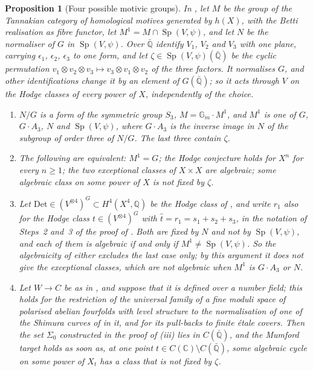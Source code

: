 \documentclass[11pt,reqno]{amsart}
\theoremstyle{plain}
\newtheorem{proposition}[theorem]{Proposition}
\theoremstyle{definition}
\theoremstyle{remark}
\newcommand{\QQ}{\mathbb{Q}}
\newcommand{\CC}{\mathbb{C}}
\DeclareMathOperator{\Sp}{Sp}
\begin{document}
\begin{proposition}[Four possible motivic groups]\label{prop:mumfordmotivic}
In , let $M$ be the group of the Tannakian category of
homological motives generated by $h(X)$, with the Betti realisation as fibre
functor, let $M^{1}=M\cap\Sp(V,\psi)$, and let $N$ be the normaliser of $G$ in
$\Sp(V,\psi)$. Over $\bar{\QQ}$ identify $V_{1}$, $V_{2}$ and $V_{3}$ with one
plane, carrying $\epsilon_{1}$, $\epsilon_{2}$, $\epsilon_{3}$ to one form, and
let $\zeta\in\Sp(V,\psi)(\bar{\QQ})$ be the cyclic permutation
$v_{1}\otimes v_{2}\otimes v_{3}\mapsto v_{3}\otimes v_{1}\otimes v_{2}$ of
the three factors. It normalises $G$, and other identifications change it by
an element of $G(\bar{\QQ})$; so it acts through $V$ on the Hodge classes of
every power of $X$, independently of the choice.
\begin{enumerate}[label=\textup{(\roman*)},leftmargin=2.6em,itemsep=2pt]
\item $N/G$ is a form of the symmetric group $S_{3}$,
  $M=\mathbb{G}_{m}\cdot M^{1}$, and $M^{1}$ is one of $G$, $G\cdot A_{3}$,
  $N$ and $\Sp(V,\psi)$, where $G\cdot A_{3}$ is the inverse image in $N$ of
  the subgroup of order three of $N/G$. The last three contain $\zeta$.
\item The following are equivalent: $M^{1}=G$; the Hodge conjecture holds for
  $X^{n}$ for every $n\ge1$; the two exceptional classes of $X\times X$ are
  algebraic; some algebraic class on some power of $X$ is not fixed by
  $\zeta$.
\item Let $\mathrm{Det}\in(V^{\otimes4})^{G}\subset H^{4}(X^{4},\QQ)$ be the
  Hodge class of , and write $r_{1}$ also for the Hodge
  class $t\in(V^{\otimes4})^{G}$ with $\hat{t}=r_{1}=s_{1}+s_{2}+s_{3}$, in the
  notation of Steps~2 and~3 of the proof of . Both
  are fixed by $N$ and not by $\Sp(V,\psi)$, and each of them is algebraic if
  and only if $M^{1}\ne\Sp(V,\psi)$. So the algebraicity of either excludes
  the last case only; by this argument it does not give the exceptional
  classes, which are not algebraic when $M^{1}$ is $G\cdot A_{3}$ or $N$.
\item Let $W\to C$ be as in , and suppose that it
  is defined over a number field; this holds for the restriction of the
  universal family of a fine moduli space of polarised abelian fourfolds with
  level structure to the normalisation of one of the Shimura curves of
  \cite{Mum69} in it, and for its pull-backs to finite \'etale covers. Then the
  set $\Sigma_{0}$ constructed in the proof of (iii) lies
  in $C(\bar{\QQ})$, and the Mumford target holds as soon as, at one point
  $t\in C(\CC)\setminus C(\bar{\QQ})$, some algebraic cycle on some power of
  $X_{t}$ has a class that is not fixed by $\zeta$.
\end{enumerate}
\end{proposition}
\end{document}
